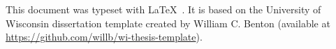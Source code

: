 This document was typeset with \LaTeX \ . It is based on the University of Wisconsin dissertation template created by William C. Benton (available at \url{https://github.com/willb/wi-thesis-template}).
 
